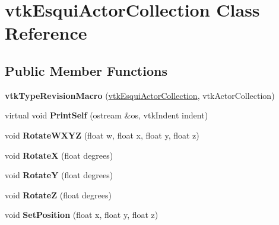 \hypertarget{classvtkEsquiActorCollection}{
\section{vtkEsquiActorCollection Class Reference}
\label{classvtkEsquiActorCollection}
}
\subsection*{Public Member Functions}
\begin{DoxyCompactItemize}
\item 
\hypertarget{classvtkEsquiActorCollection_a737ae5af06c0b319e5c894fcca6da890}{
{\bfseries vtkTypeRevisionMacro} (\hyperlink{classvtkEsquiActorCollection}{vtkEsquiActorCollection}, vtkActorCollection)}
\label{classvtkEsquiActorCollection_a737ae5af06c0b319e5c894fcca6da890}

\item 
\hypertarget{classvtkEsquiActorCollection_ae99b267b4482506ab0130fcef846e795}{
virtual void {\bfseries PrintSelf} (ostream \&os, vtkIndent indent)}
\label{classvtkEsquiActorCollection_ae99b267b4482506ab0130fcef846e795}

\item 
\hypertarget{classvtkEsquiActorCollection_a6c06dd9021c659505c6b0b0c377ffb9a}{
void {\bfseries RotateWXYZ} (float w, float x, float y, float z)}
\label{classvtkEsquiActorCollection_a6c06dd9021c659505c6b0b0c377ffb9a}

\item 
\hypertarget{classvtkEsquiActorCollection_aead543372e9986ccf30541d442ba5d80}{
void {\bfseries RotateX} (float degrees)}
\label{classvtkEsquiActorCollection_aead543372e9986ccf30541d442ba5d80}

\item 
\hypertarget{classvtkEsquiActorCollection_a8fa27c3fe1bf7a4005b26f86ae845ddc}{
void {\bfseries RotateY} (float degrees)}
\label{classvtkEsquiActorCollection_a8fa27c3fe1bf7a4005b26f86ae845ddc}

\item 
\hypertarget{classvtkEsquiActorCollection_a7ac0a8be09fd76e56c696241c9cf4964}{
void {\bfseries RotateZ} (float degrees)}
\label{classvtkEsquiActorCollection_a7ac0a8be09fd76e56c696241c9cf4964}

\item 
\hypertarget{classvtkEsquiActorCollection_aed89566d4d6d4d480555626d5ce924f0}{
void {\bfseries SetPosition} (float x, float y, float z)}
\label{classvtkEsquiActorCollection_aed89566d4d6d4d480555626d5ce924f0}


\end{DoxyCompactItemize}

